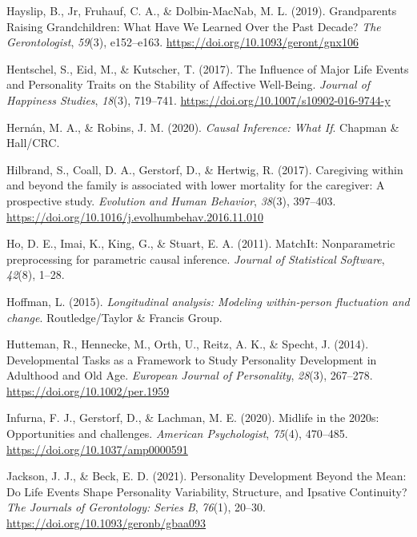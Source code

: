 \documentclass[
  english,
  man, noextraspace]{apa7}
\begin{document}
\leavevmode\hypertarget{ref-hayslipGrandparentsRaisingGrandchildren2019}{}%
Hayslip, B., Jr, Fruhauf, C. A., \& Dolbin-MacNab, M. L. (2019). Grandparents Raising Grandchildren: What Have We Learned Over the Past Decade? \emph{The Gerontologist}, \emph{59}(3), e152--e163. \url{https://doi.org/10.1093/geront/gnx106}

\leavevmode\hypertarget{ref-hentschelInfluenceMajorLife2017}{}%
Hentschel, S., Eid, M., \& Kutscher, T. (2017). The Influence of Major Life Events and Personality Traits on the Stability of Affective Well-Being. \emph{Journal of Happiness Studies}, \emph{18}(3), 719--741. \url{https://doi.org/10.1007/s10902-016-9744-y}

\leavevmode\hypertarget{ref-hernanCausalInferenceWhat2020}{}%
Hernán, M. A., \& Robins, J. M. (2020). \emph{Causal Inference: What If}. Chapman \& Hall/CRC.

\leavevmode\hypertarget{ref-hilbrandCaregivingFamilyAssociated2017}{}%
Hilbrand, S., Coall, D. A., Gerstorf, D., \& Hertwig, R. (2017). Caregiving within and beyond the family is associated with lower mortality for the caregiver: A prospective study. \emph{Evolution and Human Behavior}, \emph{38}(3), 397--403. \url{https://doi.org/10.1016/j.evolhumbehav.2016.11.010}

\leavevmode\hypertarget{ref-MatchIt2011}{}%
Ho, D. E., Imai, K., King, G., \& Stuart, E. A. (2011). MatchIt: Nonparametric preprocessing for parametric causal inference. \emph{Journal of Statistical Software}, \emph{42}(8), 1--28.

\leavevmode\hypertarget{ref-hoffmanLongitudinalAnalysisModeling2015}{}%
Hoffman, L. (2015). \emph{Longitudinal analysis: Modeling within-person fluctuation and change}. Routledge/Taylor \& Francis Group.

\leavevmode\hypertarget{ref-huttemanDevelopmentalTasksFramework2014}{}%
Hutteman, R., Hennecke, M., Orth, U., Reitz, A. K., \& Specht, J. (2014). Developmental Tasks as a Framework to Study Personality Development in Adulthood and Old Age. \emph{European Journal of Personality}, \emph{28}(3), 267--278. \url{https://doi.org/10.1002/per.1959}

\leavevmode\hypertarget{ref-infurnaMidlife2020sOpportunities2020}{}%
Infurna, F. J., Gerstorf, D., \& Lachman, M. E. (2020). Midlife in the 2020s: Opportunities and challenges. \emph{American Psychologist}, \emph{75}(4), 470--485. \url{https://doi.org/10.1037/amp0000591}

\leavevmode\hypertarget{ref-jacksonPersonalityDevelopmentMean2021}{}%
Jackson, J. J., \& Beck, E. D. (2021). Personality Development Beyond the Mean: Do Life Events Shape Personality Variability, Structure, and Ipsative Continuity? \emph{The Journals of Gerontology: Series B}, \emph{76}(1), 20--30. \url{https://doi.org/10.1093/geronb/gbaa093}
\end{document}

